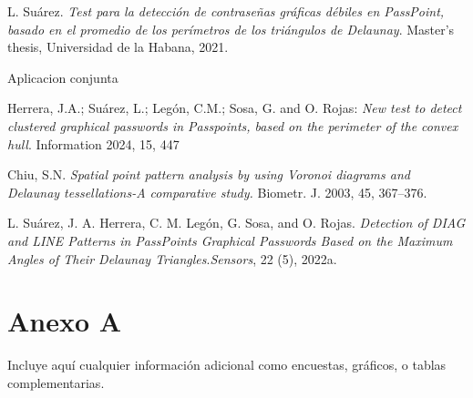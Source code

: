 \documentclass[12pt]{report}
\begin{document}
\begin{thebibliography}{9}
{	L. Suárez. \textit{Test para la detección de contraseñas gráficas débiles en PassPoint, basado en el promedio de los	perímetros de los triángulos de Delaunay}. Master’s thesis, Universidad de la Habana, 2021.
	
	 Aplicacion conjunta
	
	 Herrera, J.A.; Suárez, L.; Legón, C.M.; Sosa, G. and O. Rojas: \textit{New test to detect clustered graphical passwords   in Passpoints, based on the perimeter of the convex hull}. Information 2024, 15, 447
	
	 Chiu, S.N.\textit{ Spatial point pattern analysis by using Voronoi diagrams and Delaunay tessellations-A comparative study.} Biometr. J.
	2003, 45, 367–376.
	
	 L. Suárez, J. A. Herrera, C. M. Legón, G. Sosa, and O. Rojas. \textit{Detection of DIAG and LINE Patterns in PassPoints Graphical Passwords Based on the Maximum Angles of Their Delaunay Triangles}.\textit{Sensors}, 22
	(5), 2022a.
	
}
\end{thebibliography}


\appendix
\chapter{Anexo A}
Incluye aquí cualquier información adicional como encuestas, gráficos, o tablas complementarias.
\end{document}
